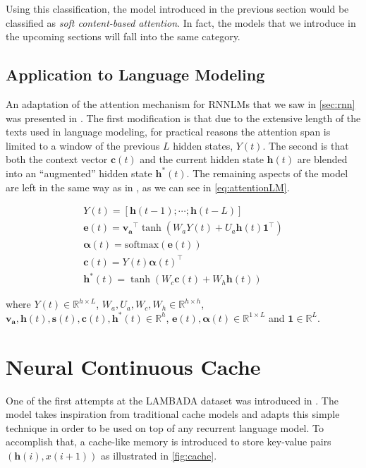 Using this classification, the model introduced in the previous section would be classified as \textit{soft content-based attention}. In fact, the models that we introduce in the upcoming sections will fall into the same category.

\subsection{Application to Language Modeling}

An adaptation of the attention mechanism for RNNLMs that we saw in \ref{sec:rnn} was presented in \cite{daniluk2017frustratingly}. The first modification is that due to the extensive length of the texts used in language modeling, for practical reasons the attention span is limited to a window of the previous $L$ hidden states, $Y(t)$. The second is that both the context vector $\mathbf{c}(t)$ and the current hidden state $\mathbf{h}(t)$ are blended into an ``augmented'' hidden state $\mathbf{h^*}(t)$. The remaining aspects of the model are left in the same way as in \cite{bahdanau2014neural}, as we can see in \autoref{eq:attentionLM}.

\begin{equation} \label{eq:attentionLM}
	\begin{gathered}
		Y(t) = [\mathbf{h}(t-1) ; \cdots ; \mathbf{h}(t-L)] \\
		\mathbf{e}(t) = \mathbf{v_a}^{\top} \tanh(W_a Y(t) + U_a\mathbf{h}(t)\mathbf{1}^{\top}) \\
		\boldsymbol{\alpha}(t) = \text{softmax}(\mathbf{e}(t)) \\
		\mathbf{c}(t) = Y(t)\boldsymbol{\alpha}(t)^{\top} \\
		\mathbf{h^*}(t) = \tanh(W_c \mathbf{c}(t) + W_h \mathbf{h}(t))
	\end{gathered}	
\end{equation}

where $Y(t) \in \mathbb{R}^{h \times L}$, $W_a,U_a,W_c,W_h \in \mathbb{R}^{h \times h}$, $\mathbf{v_a},\mathbf{h}(t),\mathbf{s}(t),\mathbf{c}(t),\mathbf{h^*}(t) \in \mathbb{R}^{h}$, $\mathbf{e}(t), \boldsymbol{\alpha}(t) \in \mathbb{R}^{1 \times L}$ and $\mathbf{1} \in \mathbb{R}^{L}$.

\section{Neural Continuous Cache}
\label{sec:continuousCache}

One of the first attempts at the LAMBADA dataset was introduced in \cite{grave2016improving}. The model takes inspiration from traditional cache models \cite{kuhn1990cache} and adapts this simple technique in order to be used on top of any recurrent language model. To accomplish that, a cache-like memory is introduced to store key-value pairs $(\mathbf{h}(i),x(i+1))$ as illustrated in \autoref{fig:cache}.

